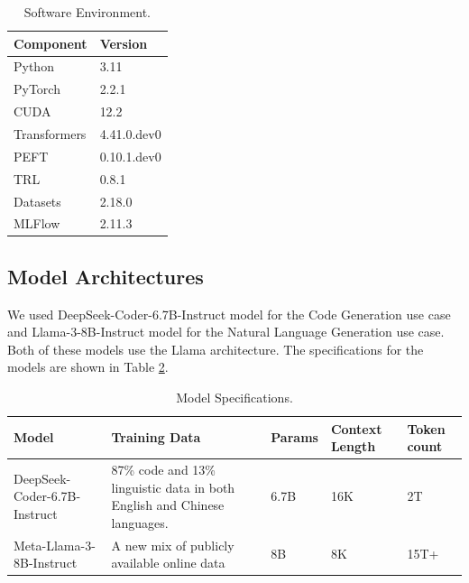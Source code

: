\begin{table}[h!]
\centering
\caption{Software Environment.}
\label{tab:software}
\begin{tabular}{| m{4cm} | m{4cm} |}
\hline
\textbf{Component} & \textbf{Version} \\
\hline
Python & 3.11 \\
PyTorch & 2.2.1 \\
CUDA & 12.2 \\
Transformers & 4.41.0.dev0 \\
PEFT & 0.10.1.dev0 \\
TRL & 0.8.1 \\
Datasets & 2.18.0 \\
MLFlow & 2.11.3 \\
\hline
\end{tabular}
\end{table}
\subsection{Model Architectures}
We used DeepSeek-Coder-6.7B-Instruct model for the Code Generation use case and Llama-3-8B-Instruct model for the Natural Language Generation use case. Both of these models use the Llama architecture. The specifications for the models are shown in Table \ref{tab:specs}.

\begin{table}[h!]
\centering
\caption{Model Specifications.}
\label{tab:specs}
\begin{tabular}{| m{4cm} | m{5cm} | m{1.2cm} | m{1.2cm} | m{1.2cm} |}
\hline
\textbf{Model} & \textbf{Training Data} & \textbf{Params} & \textbf{Context Length} & \textbf{Token count} \\
\hline
DeepSeek-Coder-6.7B-Instruct & 87\% code and 13\% linguistic data in both English and Chinese languages. & 6.7B & 16K & 2T \\
\hline
Meta-Llama-3-8B-Instruct & A new mix of publicly available online data & 8B & 8K & 15T+ \\
\hline
\end{tabular}
\end{table}

